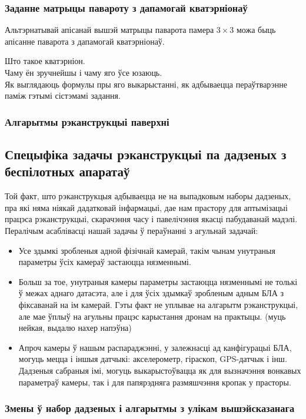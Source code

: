 \subsubsection*{Заданне матрыцы павароту з дапамогай кватэрніонаў}
Альтэрнатывай апісанай вышэй матрыцы паварота памера $3 \times 3$ можа быць апісанне паварота з дапамогай кватэрніонаў.\par
Што такое кватэрніон.\\
Чаму ён зручнейшы і чаму яго ўсе юзаюць.\\
Як выглядаюць формулы пры яго выкарыстанні, як адбываецца пераўтварэнне паміж гэтымі сістэмамі задання. \\

\subsubsection*{Алгарытмы рэканструкцыі паверхні}

\subsection*{Спецыфіка задачы рэканструкцыі па дадзеных з беспілотных апаратаў}
Той факт, што рэканструкцыя адбываецца не на выпадковым наборы дадзеных, пра які няма ніякай дадатковай інфармацыі, дае нам прастору для аптымізацыі працэса рэканструкцыі, скарачэння часу і павелічэння якасці пабудаванай мадэлі. Пералічым асаблівасці нашай задачы ў пераўнанні з агульнай задачай:
\begin{itemize}
    \item Усе здымкі зробленыя адной фізічнай камерай, такім чынам унутраныя параметры ўсіх камераў застаюцца нязменнымі.
    \item Больш за тое, унутраныя камеры параметры застаюцца нязменнымі не толькі ў межах аднаго датасэта, але і для ўсіх здымкаў зробленым адным БЛА з фіксаванай на ім камерай. Гэты факт не уплывае на алгарытм рэканструкцыі, але мае ўплыў на агульны працэс карыстання дронам на практыцы. (муць нейкая, выдалю нахер напэўна)
    \item Апроч камеры ў нашым распараджэнні, у залежнасці ад канфігурацыі БЛА, могуць мецца і іншыя датчыкі: акселерометр, гіраскоп, GPS-датчык і інш. Дадзеныя сабраныя імі, могуць выкарыстоўвацца як для вызначэння вонкавых параметраў камеры, так і для папярэдняга размяшчэння кропак у прасторы.
\end{itemize}

\subsubsection*{Змены ў набор дадзеных і алгарытмы з улікам вышэйсказанага}

\newpage